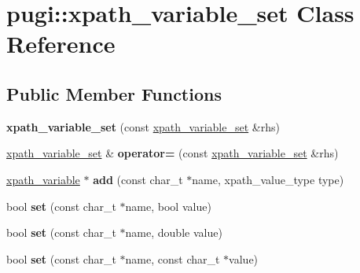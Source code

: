\hypertarget{classpugi_1_1xpath__variable__set}{\section{pugi\+:\+:xpath\+\_\+variable\+\_\+set Class Reference}
\label{classpugi_1_1xpath__variable__set}
}
\subsection*{Public Member Functions}
\begin{DoxyCompactItemize}
\item 
\hypertarget{classpugi_1_1xpath__variable__set_a7d565f9a16cab4a304d9daf93f04f9c5}{{\bfseries xpath\+\_\+variable\+\_\+set} (const \hyperlink{classpugi_1_1xpath__variable__set}{xpath\+\_\+variable\+\_\+set} \&rhs)}\label{classpugi_1_1xpath__variable__set_a7d565f9a16cab4a304d9daf93f04f9c5}

\item 
\hypertarget{classpugi_1_1xpath__variable__set_aee3129249af627510bbee5c0b07dc677}{\hyperlink{classpugi_1_1xpath__variable__set}{xpath\+\_\+variable\+\_\+set} \& {\bfseries operator=} (const \hyperlink{classpugi_1_1xpath__variable__set}{xpath\+\_\+variable\+\_\+set} \&rhs)}\label{classpugi_1_1xpath__variable__set_aee3129249af627510bbee5c0b07dc677}

\item 
\hypertarget{classpugi_1_1xpath__variable__set_a07051524f1c6a54bf8f16c9506d6ed5e}{\hyperlink{classpugi_1_1xpath__variable}{xpath\+\_\+variable} $\ast$ {\bfseries add} (const char\+\_\+t $\ast$name, xpath\+\_\+value\+\_\+type type)}\label{classpugi_1_1xpath__variable__set_a07051524f1c6a54bf8f16c9506d6ed5e}

\item 
\hypertarget{classpugi_1_1xpath__variable__set_a461660115640e623fe53af3d9f6b7a05}{bool {\bfseries set} (const char\+\_\+t $\ast$name, bool value)}\label{classpugi_1_1xpath__variable__set_a461660115640e623fe53af3d9f6b7a05}

\item 
\hypertarget{classpugi_1_1xpath__variable__set_a74c45684cc9b790601830f5c51bb8b89}{bool {\bfseries set} (const char\+\_\+t $\ast$name, double value)}\label{classpugi_1_1xpath__variable__set_a74c45684cc9b790601830f5c51bb8b89}

\item 
\hypertarget{classpugi_1_1xpath__variable__set_a6c97731437c5aa4d57b72185ee03451c}{bool {\bfseries set} (const char\+\_\+t $\ast$name, const char\+\_\+t $\ast$value)}\label{classpugi_1_1xpath__variable__set_a6c97731437c5aa4d57b72185ee03451c}


\end{DoxyCompactItemize}
